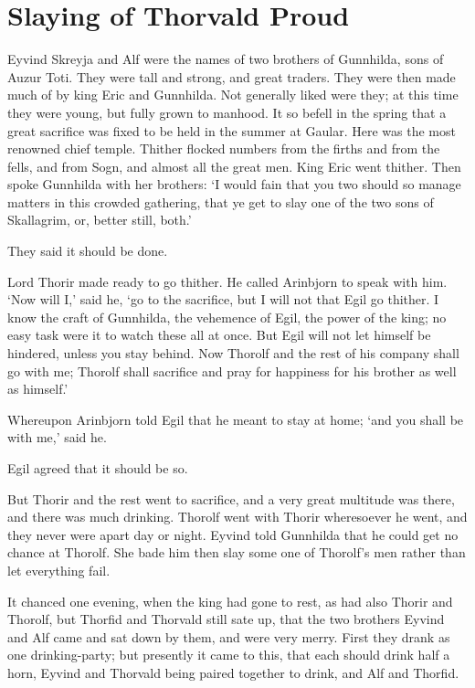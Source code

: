 \chapter{Slaying of Thorvald Proud}

Eyvind Skreyja and Alf were the names of two brothers of Gunnhilda, sons of Auzur Toti. They were tall and strong, and great traders. They were then made much of by king Eric and Gunnhilda. Not generally liked were they; at this time they were young, but fully grown to manhood. It so befell in the spring that a great sacrifice was fixed to be held in the summer at Gaular. Here was the most renowned chief temple. Thither flocked numbers from the firths and from the fells, and from Sogn, and almost all the great men. King Eric went thither. Then spoke Gunnhilda with her brothers: `I would fain that you two should so manage matters in this crowded gathering, that ye get to slay one of the two sons of Skallagrim, or, better still, both.'

They said it should be done.

Lord Thorir made ready to go thither. He called Arinbjorn to speak with him. `Now will I,' said he, `go to the sacrifice, but I will not that Egil go thither. I know the craft of Gunnhilda, the vehemence of Egil, the power of the king; no easy task were it to watch these all at once. But Egil will not let himself be hindered, unless you stay behind. Now Thorolf and the rest of his company shall go with me; Thorolf shall sacrifice and pray for happiness for his brother as well as himself.'

Whereupon Arinbjorn told Egil that he meant to stay at home; `and you shall be with me,' said he.

Egil agreed that it should be so.

But Thorir and the rest went to sacrifice, and a very great multitude was there, and there was much drinking. Thorolf went with Thorir wheresoever he went, and they never were apart day or night. Eyvind told Gunnhilda that he could get no chance at Thorolf. She bade him then slay some one of Thorolf's men rather than let everything fail.

It chanced one evening, when the king had gone to rest, as had also Thorir and Thorolf, but Thorfid and Thorvald still sate up, that the two brothers Eyvind and Alf came and sat down by them, and were very merry. First they drank as one drinking-party; but presently it came to this, that each should drink half a horn, Eyvind and Thorvald being paired together to drink, and Alf and Thorfid.

